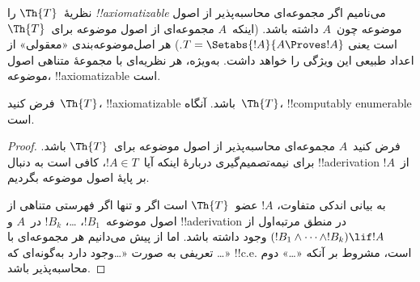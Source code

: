 \documentclass[../../../include/open-logic-section]{subfiles}
\begin{document}


نظریهٔ~$\Th{T}$ را \emph{!!{axiomatizable}} می‌نامیم اگر مجموعه‌ای
محاسبه‌پذیر از اصول موضوعه چون~$A$ داشته باشد. (اینکه~$A$ مجموعه‌ای
از اصول موضوعه برای~$\Th{T}$ است یعنی
$T = \Setabs{!A}{A \Proves !A}$.) هر اصل‌موضوعه‌بندی «معقولی» از
اعداد طبیعی این ویژگی را خواهد داشت. به‌ویژه، هر نظریه‌ای با مجموعهٔ
متناهی اصول موضوعه، !!{axiomatizable} است.

\begin{lem}
فرض کنید~$\Th{T}$، !!{axiomatizable} باشد. آنگاه~$\Th{T}$،
!!{computably
enumerable} است.
\end{lem}

\begin{proof}
فرض کنید~$A$ مجموعه‌ای محاسبه‌پذیر از اصول موضوعه برای~$\Th{T}$
باشد. برای نیمه‌تصمیم‌گیری دربارهٔ اینکه آیا~$!A \in T$، کافی است به دنبال
!!a{derivation} از~$!A$ بر پایهٔ اصول موضوعه بگردیم.

به بیانی اندکی متفاوت، $!A$ عضو~$\Th{T}$ است اگر و تنها اگر فهرستی
متناهی از اصول موضوعه~$!B_1$، \dots، $!B_k$ در~$A$ و
!!a{derivation} در منطق مرتبه‌اول از
$(!B_1 \land \dots \land !B_k) \lif !A$ وجود داشته باشد. اما از پیش
می‌دانیم هر مجموعه‌ای با تعریفی به صورت «\dots وجود دارد به‌گونه‌ای
که \dots» !!{c.e.} است، مشروط بر آنکه «\dots» دوم محاسبه‌پذیر باشد.
\end{proof}
\end{document}
